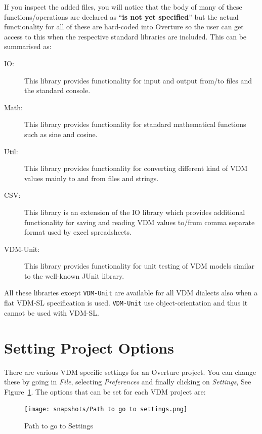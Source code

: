\documentclass{overturerepchap}
\begin{document}
If you inspect the added files, you will notice that the body
    of many of these functions/operations are declared as
    ``{\textbf{\ttfamily is not yet specified}}'' but the actual
    functionality for all of these are hard-coded into Overture so the
    user can get access to this when the respective standard libraries
    are included. This can be
    summarised as:

\begin{description}
\item[IO:] This library provides functionality for input and output
  from/to files and the standard console.
\item[Math:] This library provides functionality for standard
  mathematical functions such as sine and cosine.
\item[Util:] This library provides functionality for converting
  different kind of VDM values mainly to and from files and strings.
\item[CSV:] This library is an extension of the IO library which
  provides additional functionality for saving and reading VDM values
  to/from comma separate format used by excel spreadsheets.
\item[VDM-Unit:] This library provides functionality for unit testing
  of VDM models similar to the well-known JUnit library.
\end{description}

All these libraries except \texttt{VDM-Unit} are available for all VDM dialects also when a flat
VDM-SL specification is used. \texttt{VDM-Unit} use object-orientation and thus it cannot be used with VDM-SL.

\section{Setting Project Options}\label{subsec:options}

There are various VDM
specific settings for an Overture project. You can change these by
going in \emph{File}, selecting \emph{Preferences} and finally clicking on \emph{Settings}, See Figure~\ref{fig:pathVDMSettings}. The options
that can be set for each VDM project are:

\begin{figure}[!hbt]
\begin{center}
  \texttt{[image: snapshots/Path to go to settings.png]}
  \caption[VDM VSCode Settings]{Path to go to Settings}
  \label{fig:pathVDMSettings}
\end{center}
\end{figure}
\end{document}
